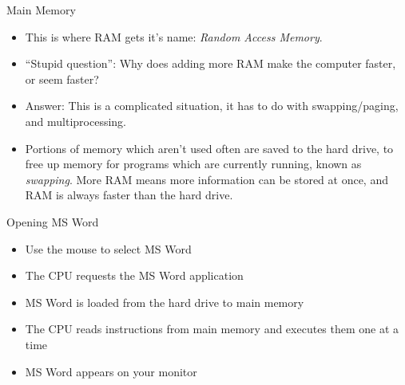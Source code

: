 \documentclass[graphics]{beamer}
\begin{document}
\begin{frame}{Main Memory}
{\begin{itemize}
        \item This is where RAM gets it's name: \textit{Random Access Memory}.
    \end{itemize}
}
 {
    \begin{itemize}
        \item ``Stupid question'': Why does adding more RAM make the computer faster, or seem faster?
        \item Answer: This is a complicated situation, it has to do with swapping/paging, and multiprocessing.
        \item Portions of memory which aren't used often are saved to the hard drive, to free up memory for programs which are currently running, known as \textit{swapping}. More RAM means more information can be stored at once, and RAM is always faster than the hard drive.
    \end{itemize}
}
\end{frame}

\begin{frame}{Opening MS Word}
    \begin{itemize}
        \item Use the mouse to select MS Word
        \item The CPU requests the MS Word application
        \item MS Word is loaded from the hard drive to main memory
        \item The CPU reads instructions from main memory and executes them one at a time
        \item MS Word appears on your monitor
    \end{itemize}
\end{frame}
\end{document}

